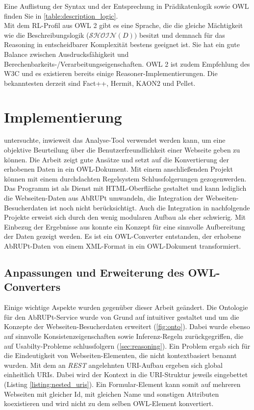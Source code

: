\documentclass[runningheads,a4paper]{llncs}
\begin{document}
Eine Auflistung der Syntax und der Entsprechung in Prädikatenlogik sowie OWL finden Sie in \ref{table:description_logic}.
\\
Mit dem RL-Profil aus OWL 2 \cite{owl2rl} gibt es eine Sprache, die die gleiche Mächtigkeit wie die Beschreibungslogik (\(\mathcal{SHOIN}(D))\) besitzt und demnach für das Reasoning in entscheidbarer Komplexität bestens geeignet ist.
Sie hat ein gute Balance zwischen Ausdrucksfähigkeit und Berechenbarkeits-/Verarbeitungseigenschaften.
OWL 2 ist zudem Empfehlung des W3C und es existieren bereits einige Reasoner-Implementierungen. 
Die bekanntesten derzeit sind Fact++, Hermit, KAON2 und Pellet.


\section{Implementierung}
\label{sec:implementation}

\cite{Brieger} untersuchte, inwieweit das Analyse-Tool \cite{abrupt} verwendet werden kann, um eine objektive Beurteilung über die Benutzerfreundlichkeit einer Webseite geben zu können. 
Die Arbeit zeigt gute Ansätze und setzt auf die Konvertierung der erhobenen Daten in ein OWL-Dokument. 
Mit einem anschließenden Projekt können mit einem durchdachten Regelsystem Schlussfolgerungen gezogenwerden. 
Das Programm ist als Dienst mit HTML-Oberfläche gestaltet und kann lediglich die Webseiten-Daten aus AbRUPt umwandeln, die Integration der Webseiten-Besucherdaten ist noch nicht berücksichtigt. 
Auch die Integration in nachfolgende Projekte erweist sich durch den wenig modularen Aufbau als eher schwierig. 
Mit Einbezug der Ergebnisse aus \cite{web_forms} konnte ein Konzept für eine sinnvolle Aufbereitung der Daten gezeigt werden. 
Es ist ein OWL-Converter entstanden, der erhobene AbRUPt-Daten von einem XML-Format in ein OWL-Dokument transformiert.

\subsection{Anpassungen und Erweiterung des OWL-Converters}
\label{sec:customization}

Einige wichtige Aspekte wurden gegenüber dieser Arbeit geändert. 
Die Ontologie für den AbRUPt-Service wurde von Grund auf intuitiver gestaltet und um die Konzepte der Webseiten-Besucherdaten erweitert (\ref{fig:onto}). 
Dabei wurde ebenso auf sinnvolle Konsistenzeigenschaften sowie Inferenz-Regeln zurückgegriffen, die auf Usabilty-Probleme schlussfolgern (\ref{sec:reasoning}).
Ein Problem ergab sich für die Eindeutigkeit von Webseiten-Elementen, die nicht kontextbasiert benannt wurden. 
Mit dem an \textit{REST} \cite{rest} angelehnten URI-Aufbau ergeben sich global einheitlich URIs.
Dabei wird der Kontext in die URI-Struktur jeweils eingebettet (Listing \ref{listing:nested_uris}). 
Ein Formular-Element kann somit auf mehreren Webseiten mit gleicher Id, mit gleichen Name und sonstigen Attributen koexistieren und wird nicht zu dem selben OWL-Element konvertiert.
\end{document}
